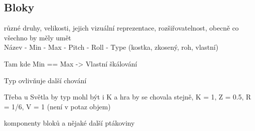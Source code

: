 
\subsection{Bloky}

různé druhy, velikosti, jejich vizuální reprezentace, rozšiřovatelnost, obecně co všechno by měly umět\\

Název - Min - Max - Pitch - Roll - Type (kostka, zkosený, roh, vlastní)

Tam kde Min == Max -> Vlastní škálování

Typ ovlivňuje další chování

Třeba u Světla by typ mohl být i K a hra by se chovala stejně, K = 1, Z = 0.5, R = 1/6, V = 1 (není v potaz objem)

komponenty bloků a nějaké další ptákoviny

